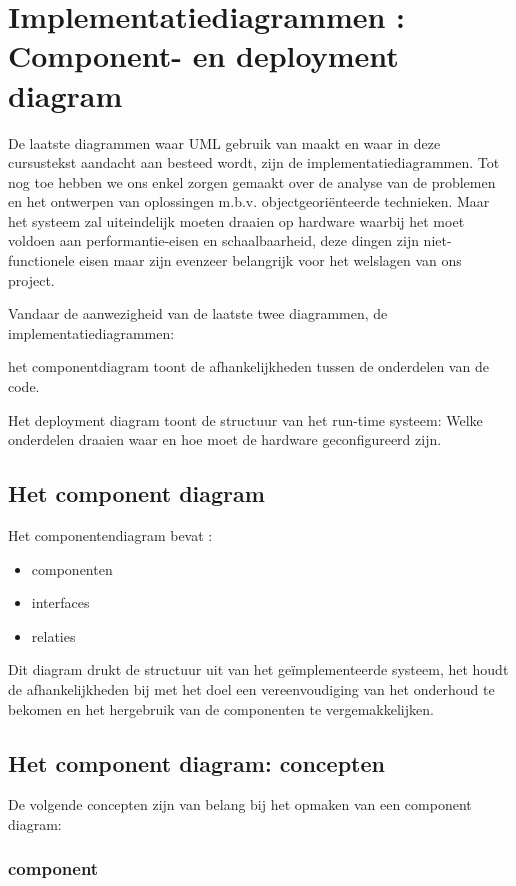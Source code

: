 \section{Implementatiediagrammen : Component- en deployment diagram}

De laatste diagrammen waar UML gebruik van maakt en waar in deze cursustekst aandacht aan besteed wordt, zijn de implementatiediagrammen. Tot nog toe hebben we ons enkel zorgen gemaakt over de analyse van de problemen en het ontwerpen van oplossingen m.b.v. objectgeoriënteerde technieken. Maar het systeem zal uiteindelijk moeten draaien op hardware waarbij het moet voldoen aan performantie-eisen en schaalbaarheid, deze dingen zijn niet-functionele eisen maar zijn evenzeer belangrijk voor het welslagen van ons project.

Vandaar de aanwezigheid van de laatste twee diagrammen, de implementatiediagrammen:

het componentdiagram toont de afhankelijkheden tussen de onderdelen van de code. 

Het deployment diagram toont de structuur van het run-time systeem: Welke onderdelen draaien waar en hoe moet de hardware geconfigureerd zijn.

\subsection{Het component diagram}

Het componentendiagram bevat :

\begin{itemize}
    \item componenten
    \item interfaces
    \item relaties
\end{itemize}

Dit diagram drukt de structuur uit van het geïmplementeerde systeem, het houdt de afhankelijkheden bij met het doel een vereenvoudiging van het onderhoud te bekomen en het hergebruik van de componenten te vergemakkelijken.

\subsection{Het component diagram: concepten}

De volgende concepten zijn van belang bij het opmaken van een component diagram:

\subsubsection{component}


